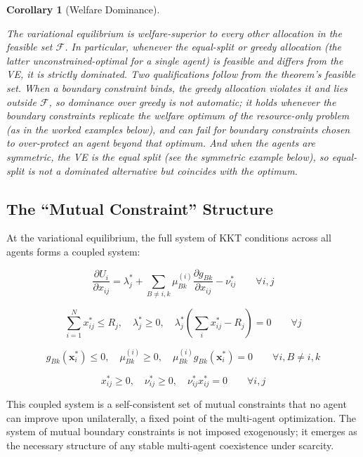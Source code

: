 \documentclass[11pt]{article}
\theoremstyle{plain}
\newtheorem{corollary}[theorem]{Corollary}
\theoremstyle{definition}
\theoremstyle{remark}
\let\origsubsection\subsection
\renewcommand{\subsection}{\needspace{7\baselineskip}\origsubsection}
\begin{document}
\begin{corollary}[Welfare Dominance]
\label{cor-welfare-dominance}

The variational equilibrium is welfare-superior to every other allocation in the feasible set $\mathcal{F}$. In particular, whenever the equal-split or greedy allocation (the latter unconstrained-optimal for a single agent) is feasible and differs from the VE, it is strictly dominated. Two qualifications follow from the theorem's feasible set. When a boundary constraint binds, the greedy allocation violates it and lies outside $\mathcal{F}$, so dominance over greedy is not automatic; it holds whenever the boundary constraints replicate the welfare optimum of the resource-only problem (as in the worked examples below), and can fail for boundary constraints chosen to over-protect an agent beyond that optimum. And when the agents are symmetric, the VE \emph{is} the equal split (see the symmetric example below), so equal-split is not a dominated alternative but coincides with the optimum.
\end{corollary}

\subsection{The ``Mutual Constraint''
Structure}\label{the-mutual-constraint-structure}

At the variational equilibrium, the full system of KKT conditions across
all agents forms a coupled system:

\[\frac{\partial U_i}{\partial x_{ij}} = \lambda_j^* + \sum_{B \neq i, k} \mu_{Bk}^{(i)} \frac{\partial g_{Bk}}{\partial x_{ij}} - \nu_{ij}^* \qquad \forall i, j\]

\[\sum_{i=1}^{N} x_{ij}^* \leq R_j, \quad \lambda_j^* \geq 0, \quad \lambda_j^*\left(\sum_i x_{ij}^* - R_j\right) = 0 \qquad \forall j\]

\[g_{Bk}(\mathbf{x}_i^*) \leq 0, \quad \mu_{Bk}^{(i)} \geq 0, \quad \mu_{Bk}^{(i)} g_{Bk}(\mathbf{x}_i^*) = 0 \qquad \forall i, B \neq i, k\]

\[x_{ij}^* \geq 0, \quad \nu_{ij}^* \geq 0, \quad \nu_{ij}^* x_{ij}^* = 0 \qquad \forall i, j\]

This coupled system is a self-consistent set of mutual constraints that
no agent can improve upon unilaterally, a fixed point of the multi-agent
optimization. The system of mutual boundary constraints is not imposed
exogenously; it emerges as the necessary structure of any stable
multi-agent coexistence under scarcity.
\end{document}
